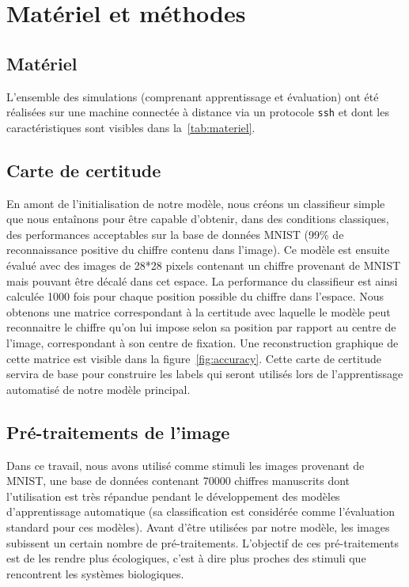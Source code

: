 \chapter{Matériel et méthodes} %
\label{Materiel_methode} %

\section{Matériel}
L'ensemble des simulations (comprenant apprentissage et évaluation) ont été réalisées sur une machine connectée à distance via un protocole \verb+ssh+ et dont les caractéristiques sont visibles dans la~\autoref{tab:materiel}.

\section{Carte de certitude}
En amont de l'initialisation de notre modèle, nous créons un classifieur simple que nous entaînons pour être capable d'obtenir, dans des conditions classiques, des performances acceptables sur la base de données MNIST (99\% de reconnaissance positive du chiffre contenu dans l'image).
Ce modèle est ensuite évalué avec des images de 28*28 pixels contenant un chiffre provenant de MNIST mais pouvant être décalé dans cet espace.
La performance du classifieur est ainsi calculée 1000 fois pour chaque position possible du chiffre dans l'espace. 
Nous obtenons une matrice correspondant à la certitude avec laquelle le modèle peut reconnaitre le chiffre qu'on lui impose selon sa position par rapport au centre de l'image, correspondant à son centre de fixation.
Une reconstruction graphique de cette matrice est visible dans la figure~\ref{fig:accuracy}.
Cette carte de certitude servira de base pour construire les labels qui seront utilisés lors de l'apprentissage automatisé de notre modèle principal.

\section{Pré-traitements de l'image}
Dans ce travail, nous avons utilisé comme stimuli les images provenant de MNIST, une base de données contenant 70000 chiffres manuscrits dont l'utilisation est très répandue pendant le développement des modèles d'apprentissage automatique (sa classification est considérée comme l'évaluation standard pour ces modèles).
Avant d'être utilisées par notre modèle, les images subissent un certain nombre de pré-traitements. 
L'objectif de ces pré-traitements est de les rendre plus écologiques, c'est à dire plus proches des stimuli que rencontrent les systèmes biologiques.

